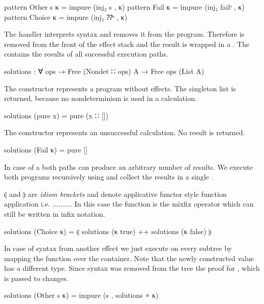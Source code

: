 \begin{code}
pattern Other s κ  = impure (inj₂ s , κ)
pattern Fail κ     = impure (inj₁ failˢ , κ)
pattern Choice κ   = impure (inj₁ ⁇ˢ , κ)
\end{code}
\begin{AgdaAlign}
  The handler interprets  syntax and removes it from the
  program.
  Therefore  is removed from the front of the effect stack
  and the result is wrapped in a .
  The  contains the results of all successful execution
  paths.
  \begin{code}
solutions : ∀ {ops} → Free (Nondet ∷ ops) A → Free ops (List A)
  \end{code}
  The  constructor represents a program without
  effects.
  The singleton list is returned, because no nondeterminism is used in a
   calculation.
  \begin{code}
solutions (pure x)     = pure (x ∷ [])
  \end{code}
  The  constructor represents an unsuccessful
  calculation.
  No result is returned.
  \begin{code}
solutions (Fail κ)     = pure []
  \end{code}
  In case of a  both paths can produce an
  arbitrary number of results.
  We execute both programs recursively using  and
  collect the results in a single .

  $\llparenthesis$ and $\rrparenthesis$ are \textit{idiom brackets} and denote
  applicative functor style function application i.e.
  \AgdaSpace{}\AgdaSpace{}\AgdaFunction{<*>}$\dots$\AgdaFunction{<*>}$\dots$\AgdaFunction{<*>}$\dots$.
  In this case the function  is the mixfix operator
  \AgdaFunction{\_++\_} which can still be written in infix notation.
  \begin{code}
solutions (Choice κ)   = ⦇ solutions (κ true) ++ solutions (κ false) ⦈
  \end{code}
  In case of syntax from another effect we just execute 
  on every subtree by mapping the function over the container.
  Note that the newly constructed value has a different type.
  Since  syntax was removed from the tree the proof for
  , which is passed to 
  changes.
  \begin{code}
solutions (Other s κ)  = impure (s , solutions ∘ κ)
  \end{code}
\end{AgdaAlign}


